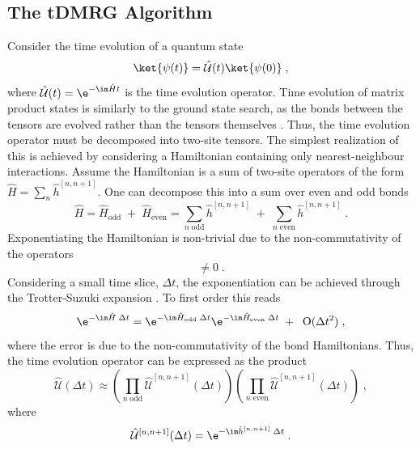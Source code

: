 \subsection{The tDMRG Algorithm}
Consider the time evolution of a quantum state
\begin{equation}
	\ket{\psi (t)} = \hat{\mathcal{U}}(t) \ket{\psi (0)} \; ,
\end{equation}
where $\hat{\mathcal{U}}(t) = \e^{ - \im \hat{H} t }$ is the time evolution operator. 
Time evolution of matrix product states is similarly to the ground state search, as the bonds between the tensors are evolved rather than the tensors themselves \cite{Vidal2003,Vidal2004}. Thus, the time evolution operator must be decomposed into two-site tensors. The simplest realization of this is achieved by considering a Hamiltonian containing only nearest-neighbour interactions.
Assume the Hamiltonian is a sum of two-site operators of the form $\hat{H} = \sum_{n} \hat{h}^{[n , n+1]}$. One can decompose this into a sum over even and odd bonds \cite{Vidal2004}
\begin{equation}
	\hat{H} = \hat{H}_{\mathrm{odd}} \; + \; \hat{H}_{\mathrm{even}} = \sum_{n \; \mathrm{odd}} \hat{h}^{[n , n+1]} \; + \; \sum_{n \; \mathrm{even}} \hat{h}^{[n , n+1]} \; .
\end{equation}  
Exponentiating the Hamiltonian is non-trivial due to the non-commutativity of the operators
\begin{equation}
	[ \hat{h}_{\mathrm{odd}}^{[n , n+1]} \; , \; \hat{h}_{\mathrm{even}}^{[n , n+1]} ] \neq 0 \; .
\end{equation}
Considering a small time slice, $\Delta t$, the exponentiation can be achieved through the Trotter-Suzuki expansion \cite{Suzuki1991}. To first order this reads
\begin{equation}
	\e^{- \im \hat{H} \; \Delta t} = \e^{- \im \hat{H}_{\mathrm{odd}} \; \Delta t } \e^{- \im \hat{H}_{\mathrm{even}} \; \Delta t} \; + \; \;  \mathrm{O}(\Delta t^2) \; ,
\end{equation}
where the error is due to the non-commutativity of the bond Hamiltonians. Thus, the time evolution operator can be expressed as the product
\begin{equation}
	\hat{\mathcal{U}}(\Delta t) \approx \left( \prod_{n \; \mathrm{odd}} \hat{\mathcal{U}}^{[n,n+1]} (\Delta t) \right) \left( \prod_{n \; \mathrm{even}} \hat{\mathcal{U}}^{[n,n+1]} (\Delta t) \right) \; , \label{eq:SuzukiTrotter1stOrder}
\end{equation}
where
\begin{equation}
	\hat{\mathcal{U}}^{[n,n+1]} (\Delta t) = \e^{- \im \hat{h}^{[n , n+1]} \; \Delta t } \; .
\end{equation}
